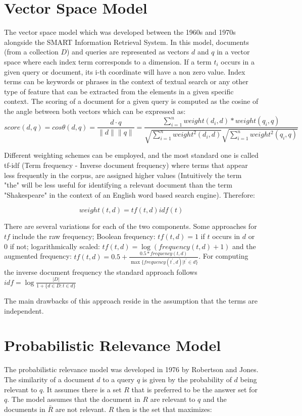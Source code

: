 \section{Vector Space Model}
The vector space model\cite{vector_space_model} which was developed between the 1960s and 1970s alongside the SMART Information Retrieval System. In this model, documents (from a collection $D$) and queries are represented as vectors $d$ and $q$ in a vector space where each index term corresponds to a dimension. If a term $t_i$ occurs in a given query or document, its i-th  coordinate will have a non zero value. Index terms can be keywords or phrases in the context of textual search or any other type of feature that can be extracted from the elements in a given specific context.
The scoring of a document for a given query is computed as the cosine of the angle between both vectors which can be expressed as: 
$$score(d, q) = cos\theta(d, q) = \frac{d \cdot q}{\parallel d \parallel \parallel q \parallel}  = \frac{\sum_{i=1}^{n}weight(d_i, d)*weight(q_i, q)}{\sqrt{\sum_{i=1}^{n}weight^2(d_i, d)}\sqrt{\sum_{i=1}^{n}weight^2(q_i, q)}} $$

Different weighting schemes can be employed, and the most standard one is called tf-idf (Term frequency - Inverse document frequency) where terms that appear less frequently in the corpus, are assigned higher values (Intuitively the term "the" will be less useful for identifying a relevant document than the term "Shakespeare" in the context of an English word based search engine). Therefore:

$$weight(t, d) = tf(t,d) idf(t)$$

There are several variations for each of the two components. Some approaches for $tf$ include the raw frequency; Boolean frequency: $tf(t,d) = 1$ if $t$ occurs in $d$ or 0 if not; logarithmically scaled: $tf(t,d) = 	\log(frequency(t,d) +1)$
and the augmented frequency: $tf(t,d) = 0.5 + \frac{0.5*frequency(t,d)}{ \max\{frequency(t^\prime,d) | t^\prime \in d\} }$. For computing the inverse document frequency the standard approach follows $idf = \log \frac{|D|}{1+\{d \in D: t \in d \}} $

The main drawbacks of this approach reside in the assumption that the terms are independent.

\section{Probabilistic Relevance Model}
The probabilistic relevance model was developed in 1976 by Robertson and Jones\cite{probabilistic_relevance_model}. The similarity of a document $d$ to a query $q$ is given by the probability of $d$ being relevant to $q$. It assumes there is a set $R$ that is preferred to be the answer set for $q$. The model assumes that the document in $R$ are relevant to $q$ and the documents in $\bar{R}$ are not relevant. $R$ then is the set that maximizes:

